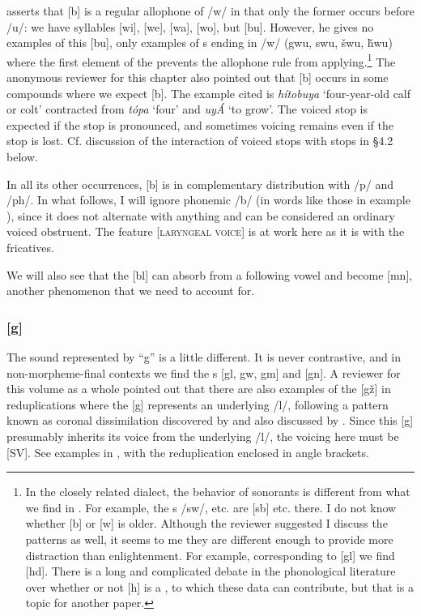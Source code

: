 \documentclass[output=paper]{LSP/langsci}
\begin{document}
\citet[8]{Rankin2001} asserts that [b] is a regular allophone of /w/ in that only the former occurs before /u/: we have syllables [wi], [we], [wa], [wo], but [bu]. However, he gives no examples of this [bu], only examples of s ending in /w/ (gwu, swu, \v{s}wu, \v{h}wu) where the first element of the  prevents the allophone rule from applying.\footnote{In the closely related  dialect, the behavior of sonorants is different from what we find in . For example, the s /sw/, etc. are [sb] etc. there. I do not know whether [b] or [w] is older. Although the reviewer suggested I discuss the  patterns as well, it seems to me they are different enough to provide more distraction than enlightenment. For example, corresponding to  [gl] we find  [hd]. There is a long and complicated debate in the phonological literature over whether or not [h] is a , to which these  data can contribute, but that is a topic for another paper.} The anonymous reviewer for this chapter also pointed out that [b] occurs in some compounds where we expect [b]. The example cited is \textit{h\'itobuya} `four-year-old calf or colt' contracted from \textit{t\'opa} `four' and \textit{uy\'A} `to grow'. The voiced stop is expected if the  stop is pronounced, and sometimes voicing remains even if the  stop is lost. Cf. discussion of the interaction of voiced stops with  stops in \S 4.2 below.

In all its other occurrences, [b] is in complementary distribution with /p/ and /ph/. In what follows, I will ignore phonemic /b/ (in words like those in example ), since it does not alternate with anything and can be considered an ordinary voiced obstruent. The feature [\textsc{laryngeal voice}] is at work here as it is with the fricatives.

We will also see that the [bl]  can absorb  from a following vowel and become [mn], another phenomenon that we need to account for.

\subsubsection{[g]} 
The sound represented by ``g'' is a little different. It is never contrastive, and in non-morpheme-final contexts we find the s [gl, gw, gm] and [gn]. A reviewer for this volume as a whole pointed out that there are also examples of the  [g\v{z}] in reduplications where the [g] represents an underlying /l/, following a pattern known as coronal dissimilation discovered by \citet[225--226]{Carter1974} and also discussed by \citet[338]{Shaw1980}.  Since this [g] presumably inherits its voice from the underlying /l/, the voicing here must be [\textsc{SV}].  See examples in , with the reduplication enclosed in angle brackets.
 
\end{document}
